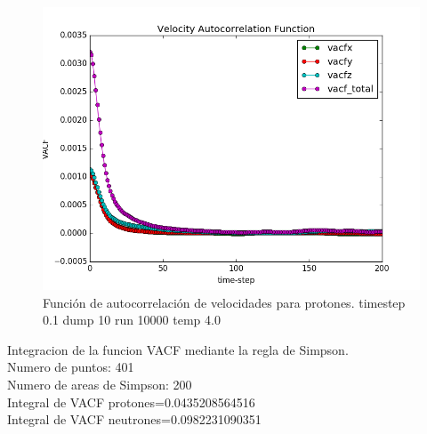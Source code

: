 \documentclass[
 reprint,
 amsmath,amssymb,
 aps,
 a4paper
]{revtex4-1}
\begin{document}
\begin{figure}[H]
\centerline{
  \includegraphics[width=1.0\linewidth]{vacf_Z_200.png}}
  \caption{\small Función de autocorrelación de velocidades para protones. timestep 0.1 dump 10 run 10000 temp 4.0}
  \label{fig:vacf_Z_200}
\end{figure}

Integracion de la funcion VACF mediante la regla de Simpson.\\
Numero de puntos: 401\\
Numero de areas de Simpson: 200\\
Integral de VACF protones=0.0435208564516\\
Integral de VACF neutrones=0.0982231090351\\
\end{document}
